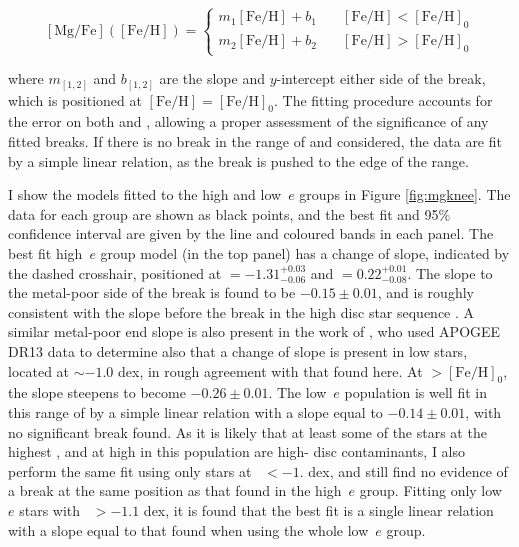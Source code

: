 \begin{equation}
\label{eq:pwlin}
\mathrm{[Mg/Fe]}(\mathrm{[Fe/H]}) =
  \begin{cases}
    m_{1}\mathrm{[Fe/H]} + b_1  &  \quad \mathrm{[Fe/H]} < \mathrm{[Fe/H]}_0\\
    m_{2}\mathrm{[Fe/H]} + b_2  &  \quad \mathrm{[Fe/H]} > \mathrm{[Fe/H]}_0
  \end{cases}
\end{equation}

\noindent where $m_{[1,2]}$ and $b_{[1,2]}$ are the slope and
$y$-intercept either side of the break, which is positioned at
$\mathrm{[Fe/H]}=\mathrm{[Fe/H]}_0$. The fitting procedure accounts
for the error on both \mgfe{} and \feh{}, allowing a proper assessment
of the significance of any fitted breaks. If there is no break in
the range of \mgfe{} and \feh{} considered, the data are fit by a
simple linear relation, as the break is pushed to the edge of the
\feh{} range.

I show the models fitted to the high and low~$e$ groups in Figure
\ref{fig:mgknee}. The data for each group are shown as black
points, and the best fit and 95$\%$ confidence interval are given
by the line and coloured bands in each panel. The best fit high~$e$ group
model (in the top panel) has a change of slope, indicated by the dashed crosshair, positioned at
\feh{}$=-1.31^{+0.03}_{-0.06}$ and \mgfe{}$=0.22^{+0.01}_{-0.08}$.
The  slope to the metal-poor side of the break is found to
be $-0.15\pm{0.01}$, and is roughly consistent with the slope before
the break in the high \mgfe{} disc star sequence \citep[e.g. that
seen in][]{2015ApJ...808..132H}. A similar metal-poor end slope 
is also present in the work of \citet{2018ApJ...852...50F},
who used APOGEE DR13 data to determine also that a change of slope
is present in low \mgfe{} stars, located at \feh{}$\sim-1.0$ dex,
in rough agreement with that found here. At \feh{}$>\mathrm{[Fe/H]}_0$,
the slope steepens to become $-0.26\pm{0.01}$. The low~$e$ population
is well fit in this range of \feh{} by a simple linear relation
with a slope equal to $-0.14\pm{0.01}$, with no significant break
found. As it is likely that at least some of the stars at the highest
\feh{}, and at high \mgfe{} in this population are high-\afe{} disc
contaminants, I also perform the same fit using only stars at \feh{}~$<-1.$
dex, and still find no evidence of a break at the same position as
that found in the high~$e$ group. Fitting only low~$e$ stars with
\feh{}~$>-1.1$ dex, it is found that the best fit is a single linear
relation with a slope equal to that found when using the whole
low~$e$ group.

